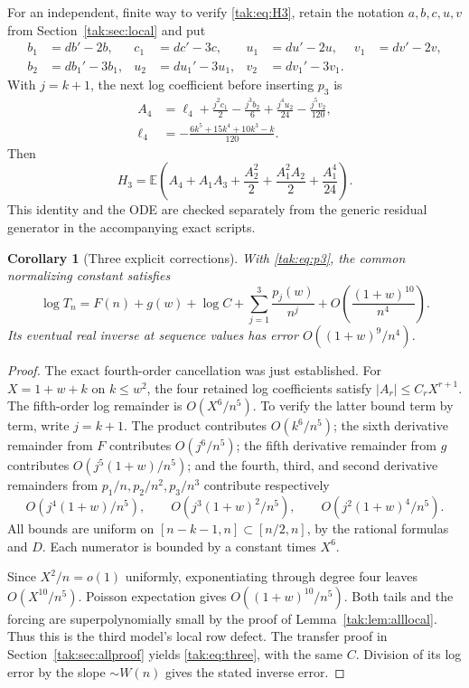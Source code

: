 \documentclass[11pt,letterpaper]{article}
\newtheorem{corollary}[theorem]{Corollary}
\theoremstyle{remark}\newtheorem{remark}[theorem]{Remark}
\newcommand{\E}{\mathbb E}\newcommand{\Pp}{\mathbb P}
\begin{document}
For an independent, finite way to verify \eqref{tak:eq:H3}, retain the notation $a,b,c,u,v$ from Section~\ref{tak:sec:local} and put
\begin{align*}
 b_1&=db'-2b,& c_1&=dc'-3c,&u_1&=du'-2u,&v_1&=dv'-2v,\\
 b_2&=db_1'-3b_1,&u_2&=du_1'-3u_1,&v_2&=dv_1'-3v_1.
\end{align*}
With $j=k+1$, the next log coefficient before inserting $p_3$ is
\begin{align*}
 A_4&=\ell_4+\frac{j^2c_1}{2}-\frac{j^3b_2}{6}
                   +\frac{j^4u_2}{24}-\frac{j^5v_2}{120},\\
 \ell_4&=-\frac{6k^5+15k^4+10k^3-k}{120}.
\end{align*}
Then
\[
 H_3=\E\left(A_4+A_1A_3+\frac{A_2^2}{2}
                    +\frac{A_1^2A_2}{2}+\frac{A_1^4}{24}\right).
\]
This identity and the ODE are checked separately from the generic residual generator in the accompanying exact scripts.

\begin{corollary}[Three explicit corrections]\label{tak:cor:three}
With \eqref{tak:eq:p3}, the common normalizing constant satisfies
\begin{equation}
 \log T_n=F(n)+g(w)+\log C+\sum_{j=1}^3\frac{p_j(w)}{n^j}
              +O\!\left(\frac{(1+w)^{10}}{n^4}\right).\label{tak:eq:three}
\end{equation}
Its eventual real inverse at sequence values has error $O((1+w)^9/n^4)$.
\end{corollary}
\begin{proof}
The exact fourth-order cancellation was just established. For $X=1+w+k$ on $k\leq w^2$, the four retained log coefficients satisfy $|A_r|\leq C_rX^{r+1}$. The fifth-order log remainder is $O(X^6/n^5)$. To verify the latter bound term by term, write $j=k+1$. The product contributes $O(k^6/n^5)$; the sixth derivative remainder from $F$ contributes $O(j^6/n^5)$; the fifth derivative remainder from $g$ contributes $O(j^5(1+w)/n^5)$; and the fourth, third, and second derivative remainders from $p_1/n,p_2/n^2,p_3/n^3$ contribute respectively
\[
 O(j^4(1+w)/n^5),\qquad O(j^3(1+w)^2/n^5),\qquad O(j^2(1+w)^4/n^5).
\]
All bounds are uniform on $[n-k-1,n]\subset[n/2,n]$, by the rational formulas and $D$. Each numerator is bounded by a constant times $X^6$.

Since $X^2/n=o(1)$ uniformly, exponentiating through degree four leaves $O(X^{10}/n^5)$. Poisson expectation gives $O((1+w)^{10}/n^5)$. Both tails and the forcing are superpolynomially small by the proof of Lemma~\ref{tak:lem:alllocal}. Thus this is the third model's local row defect. The transfer proof in Section~\ref{tak:sec:allproof} yields \eqref{tak:eq:three}, with the same $C$. Division of its log error by the slope $\sim W(n)$ gives the stated inverse error.
\end{proof}
\end{document}

